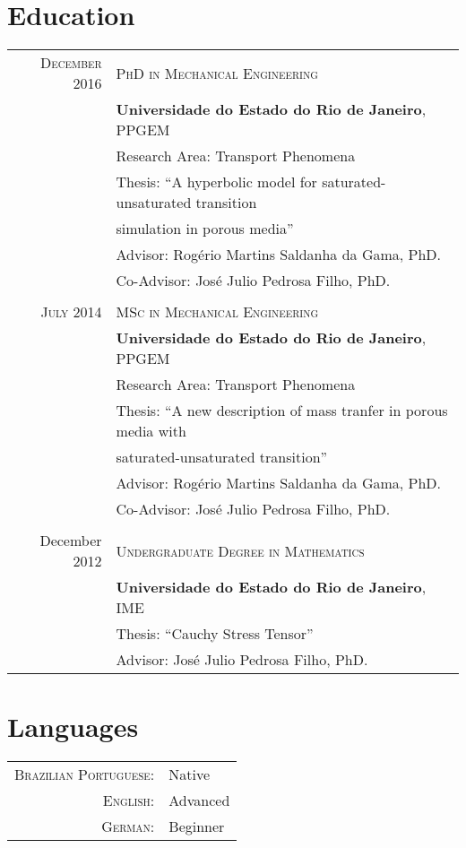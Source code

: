 \documentclass[a4paper,10pt]{article}
\begin{document}
\section{Education}
\begin{tabular}{rl}

\textsc{December} 2016 & \textsc{PhD in Mechanical Engineering}\\&
\textbf{Universidade do Estado do Rio de Janeiro}, \textsc{PPGEM}\\&
Research Area: Transport Phenomena\\&
Thesis: “A hyperbolic model for saturated-unsaturated transition\\& simulation in porous media”\\&
Advisor: Rogério Martins Saldanha da Gama, PhD.\\&
Co-Advisor: José Julio Pedrosa Filho, PhD.\\
\\
\textsc{July 2014} & \textsc{MSc in Mechanical Engineering}\\&
\textbf{Universidade do Estado do Rio de Janeiro}, \textsc{PPGEM}\\&
Research Area: Transport Phenomena\\&
Thesis: “A new description of mass tranfer in porous media with\\&
saturated-unsaturated transition”\\&
Advisor: Rogério Martins Saldanha da Gama, PhD.\\&
Co-Advisor: José Julio Pedrosa Filho, PhD.\\
\\
December 2012 & \textsc{Undergraduate Degree in Mathematics}\\&
\textbf{Universidade do Estado do Rio de Janeiro}, \textsc{IME}\\&
Thesis: “Cauchy Stress Tensor”\\&
Advisor: José Julio Pedrosa Filho, PhD.\\

\end{tabular}

\section{Languages}
\begin{tabular}{rl}
\textsc{Brazilian Portuguese:}&Native\\
\textsc{English:}&Advanced\\
\textsc{German:}&Beginner\\
\end{tabular}


\end{document}
